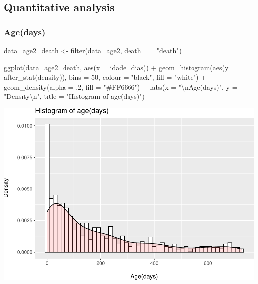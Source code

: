 \documentclass[
]{article}
\newenvironment{Shaded}{\begin{snugshade}}{\end{snugshade}}
\newcommand{\AttributeTok}[1]{\textcolor[rgb]{0.77,0.63,0.00}{#1}}
\newcommand{\DecValTok}[1]{\textcolor[rgb]{0.00,0.00,0.81}{#1}}
\newcommand{\FunctionTok}[1]{\textcolor[rgb]{0.00,0.00,0.00}{#1}}
\newcommand{\NormalTok}[1]{#1}
\newcommand{\OtherTok}[1]{\textcolor[rgb]{0.56,0.35,0.01}{#1}}
\newcommand{\SpecialCharTok}[1]{\textcolor[rgb]{0.00,0.00,0.00}{#1}}
\newcommand{\StringTok}[1]{\textcolor[rgb]{0.31,0.60,0.02}{#1}}
\renewenvironment{Shaded}{\begin{mdframed}[ backgroundcolor=shadecolor, linecolor = shadecolor, leftmargin=\dimexpr\leftmargin-2pt\relax, innerleftmargin=1.6pt, innertopmargin=5pt, skipabove=10pt,skipbelow=3pt ]}{\end{mdframed}}
\begin{document}
\hypertarget{quantitative-analysis-1}{%
\subsection{Quantitative analysis}\label{quantitative-analysis-1}}

\hypertarget{agedays}{%
\subsubsection{Age(days)}\label{agedays}}

\begin{Shaded}
\begin{Highlighting}[]
\NormalTok{data\_age2\_death }\OtherTok{\textless{}{-}} \FunctionTok{filter}\NormalTok{(data\_age2, death }\SpecialCharTok{==} \StringTok{"death"}\NormalTok{)}

\FunctionTok{ggplot}\NormalTok{(data\_age2\_death, }\FunctionTok{aes}\NormalTok{(}\AttributeTok{x =}\NormalTok{ idade\_dias)) }\SpecialCharTok{+} 
  \FunctionTok{geom\_histogram}\NormalTok{(}\FunctionTok{aes}\NormalTok{(}\AttributeTok{y =} \FunctionTok{after\_stat}\NormalTok{(density)), }
                 \AttributeTok{bins =} \DecValTok{50}\NormalTok{,}
                 \AttributeTok{colour =} \StringTok{"black"}\NormalTok{,}
                 \AttributeTok{fill =} \StringTok{"white"}\NormalTok{) }\SpecialCharTok{+}
  \FunctionTok{geom\_density}\NormalTok{(}\AttributeTok{alpha =}\NormalTok{ .}\DecValTok{2}\NormalTok{, }\AttributeTok{fill =} \StringTok{"\#FF6666"}\NormalTok{) }\SpecialCharTok{+}
  \FunctionTok{labs}\NormalTok{(}\AttributeTok{x =} \StringTok{"}\SpecialCharTok{\textbackslash{}n}\StringTok{Age(days)"}\NormalTok{,}
       \AttributeTok{y =} \StringTok{"Density}\SpecialCharTok{\textbackslash{}n}\StringTok{"}\NormalTok{,}
       \AttributeTok{title =} \StringTok{"Histogram of age(days)"}\NormalTok{)}
\end{Highlighting}
\end{Shaded}

\includegraphics{age_analysis_files/figure-latex/unnamed-chunk-12-1.pdf}
\end{document}
